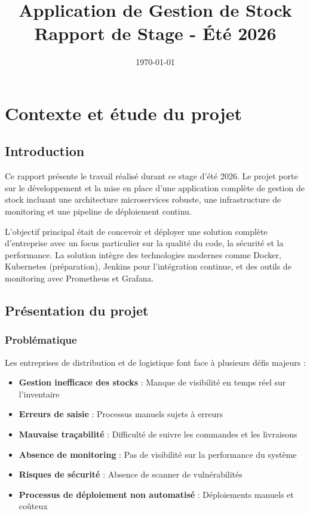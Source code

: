 \documentclass[12pt,a4paper]{report}
\title{Application de Gestion de Stock\\Rapport de Stage - Été 2026}
\author{}
\date{\today}
\begin{document}
\maketitle
\newpage
\tableofcontents
\newpage

\chapter{Contexte et étude du projet}

\section{Introduction}

Ce rapport présente le travail réalisé durant ce stage d'été 2026. Le projet porte sur le développement et la mise en place d'une application complète de gestion de stock incluant une architecture microservices robuste, une infrastructure de monitoring et une pipeline de déploiement continu.

L'objectif principal était de concevoir et déployer une solution complète d'entreprise avec un focus particulier sur la qualité du code, la sécurité et la performance. La solution intègre des technologies modernes comme Docker, Kubernetes (préparation), Jenkins pour l'intégration continue, et des outils de monitoring avec Prometheus et Grafana.

\section{Présentation du projet}

\subsection{Problématique}

Les entreprises de distribution et de logistique font face à plusieurs défis majeurs :

\begin{itemize}
    \item \textbf{Gestion inefficace des stocks} : Manque de visibilité en temps réel sur l'inventaire
    \item \textbf{Erreurs de saisie} : Processus manuels sujets à erreurs
    \item \textbf{Mauvaise traçabilité} : Difficulté de suivre les commandes et les livraisons
    \item \textbf{Absence de monitoring} : Pas de visibilité sur la performance du système
    \item \textbf{Risques de sécurité} : Absence de scanner de vulnérabilités
    \item \textbf{Processus de déploiement non automatisé} : Déploiements manuels et coûteux
\end{itemize}
\end{document}
